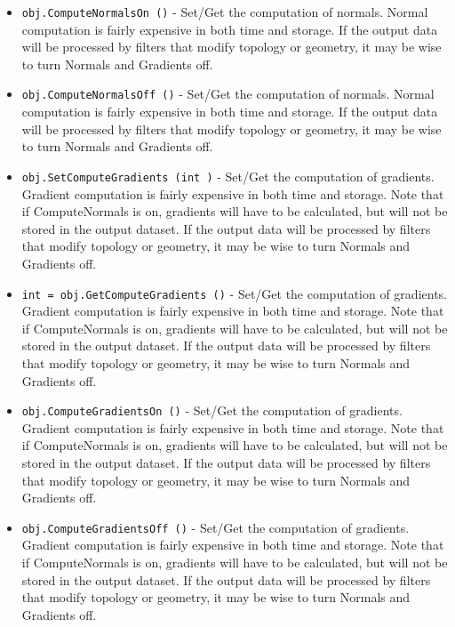 \begin{itemize}
\item  \verb|obj.ComputeNormalsOn ()| -  Set/Get the computation of normals. Normal computation is fairly
 expensive in both time and storage. If the output data will be
 processed by filters that modify topology or geometry, it may be
 wise to turn Normals and Gradients off.

\item  \verb|obj.ComputeNormalsOff ()| -  Set/Get the computation of normals. Normal computation is fairly
 expensive in both time and storage. If the output data will be
 processed by filters that modify topology or geometry, it may be
 wise to turn Normals and Gradients off.

\item  \verb|obj.SetComputeGradients (int )| -  Set/Get the computation of gradients. Gradient computation is
 fairly expensive in both time and storage. Note that if
 ComputeNormals is on, gradients will have to be calculated, but
 will not be stored in the output dataset.  If the output data
 will be processed by filters that modify topology or geometry, it
 may be wise to turn Normals and Gradients off.

\item  \verb|int = obj.GetComputeGradients ()| -  Set/Get the computation of gradients. Gradient computation is
 fairly expensive in both time and storage. Note that if
 ComputeNormals is on, gradients will have to be calculated, but
 will not be stored in the output dataset.  If the output data
 will be processed by filters that modify topology or geometry, it
 may be wise to turn Normals and Gradients off.

\item  \verb|obj.ComputeGradientsOn ()| -  Set/Get the computation of gradients. Gradient computation is
 fairly expensive in both time and storage. Note that if
 ComputeNormals is on, gradients will have to be calculated, but
 will not be stored in the output dataset.  If the output data
 will be processed by filters that modify topology or geometry, it
 may be wise to turn Normals and Gradients off.

\item  \verb|obj.ComputeGradientsOff ()| -  Set/Get the computation of gradients. Gradient computation is
 fairly expensive in both time and storage. Note that if
 ComputeNormals is on, gradients will have to be calculated, but
 will not be stored in the output dataset.  If the output data
 will be processed by filters that modify topology or geometry, it
 may be wise to turn Normals and Gradients off.


\end{itemize}
